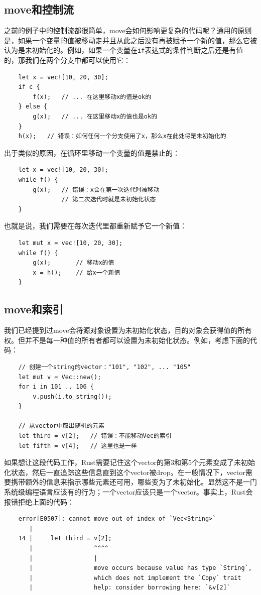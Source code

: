\subsection{move和控制流}
之前的例子中的控制流都很简单，move会如何影响更复杂的代码呢？通用的原则是，如果一个变量的值被移动走并且从此之后没有再被赋予一个新的值，那么它被认为是未初始化的。例如，如果一个变量在\texttt{if}表达式的条件判断之后还是有值的，那我们在两个分支中都可以使用它：
\begin{verbatim}
    let x = vec![10, 20, 30];
    if c {
        f(x);   // ... 在这里移动x的值是ok的
    } else {
        g(x);   // ... 在这里移动x的值也是ok的
    }
    h(x);   // 错误：如何任何一个分支使用了x，那么x在此处将是未初始化的
\end{verbatim}

出于类似的原因，在循环里移动一个变量的值是禁止的：
\begin{verbatim}
    let x = vec![10, 20, 30];
    while f() {
        g(x);   // 错误：x会在第一次迭代时被移动
                // 第二次迭代时就是未初始化状态 
    }
\end{verbatim}

也就是说，我们需要在每次迭代里都重新赋予它一个新值：
\begin{verbatim}
    let mut x = vec![10, 20, 30];
    while f() {
        g(x);       // 移动x的值
        x = h();    // 给x一个新值
    }
\end{verbatim}

\subsection{move和索引}

我们已经提到过move会将源对象设置为未初始化状态，目的对象会获得值的所有权。但并不是每一种值的所有者都可以设置为未初始化状态。例如，考虑下面的代码：
\begin{verbatim}
    // 创建一个string的vector："101", "102", ... "105"
    let mut v = Vec::new();
    for i in 101 .. 106 {
        v.push(i.to_string());
    }

    // 从vector中取出随机的元素
    let third = v[2];   // 错误：不能移动Vec的索引
    let fifth = v[4];   // 这里也是一样
\end{verbatim}

如果想让这段代码工作，Rust需要记住这个vector的第3和第5个元素变成了未初始化状态，然后一直追踪这些信息直到这个vector被drop。在一般情况下，vector需要携带额外的信息来指示哪些元素还可用，哪些变为了未初始化。显然这不是一门系统级编程语言应该有的行为；一个vector应该只是一个vector。事实上，Rust会报错拒绝上面的代码：
\begin{verbatim}
    error[E0507]: cannot move out of index of `Vec<String>`
       |
    14 |     let third = v[2];
       |                 ^^^^
       |                 |
       |                 move occurs because value has type `String`,
       |                 which does not implement the `Copy` trait
       |                 help: consider borrowing here: `&v[2]`
\end{verbatim}

